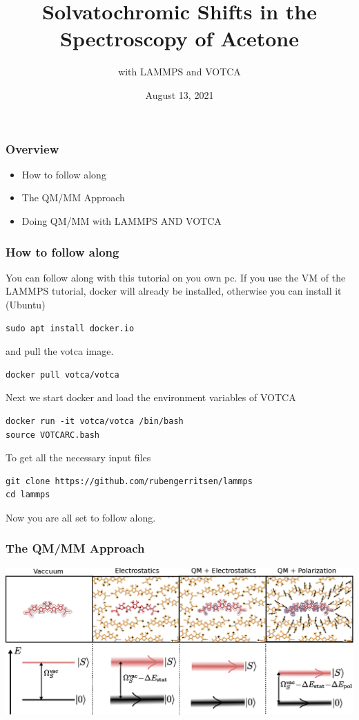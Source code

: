 \documentclass[t,aspectratio=169, 8pt]{beamer}
\title{Solvatochromic Shifts in the Spectroscopy of Acetone}
\subtitle{\Large with LAMMPS and VOTCA}
\author{August 13, 2021}
\begin{document}
\begin{titleframe}[variant=1,bgimage=background.png]
\end{titleframe}

\begin{chapterframe}
  \frametitle{Overview}
  \begin{itemize}
    \item How to follow along
    \item The QM/MM Approach
    \item Doing QM/MM with LAMMPS AND VOTCA
  \end{itemize}
\end{chapterframe}



\begin{frame}[fragile]
  \frametitle{How to follow along}
  You can follow along with this tutorial on you own pc. If you use the VM of the LAMMPS tutorial, docker will already be installed, otherwise you can install it (Ubuntu)
  \begin{verbatim}
sudo apt install docker.io
  \end{verbatim}
  and pull the votca image.
  \begin{verbatim}
docker pull votca/votca
  \end{verbatim}
  Next we start docker and load the environment variables of VOTCA
  \begin{verbatim}
docker run -it votca/votca /bin/bash
source VOTCARC.bash
  \end{verbatim}
  To get all the necessary input files
  \begin{verbatim}
git clone https://github.com/rubengerritsen/lammps
cd lammps
\end{verbatim}
  Now you are all set to follow along.
\end{frame}


\begin{frame}
  \frametitle{The QM/MM Approach}
  \centering
  \includegraphics[height=0.65\textheight]{images/siteenergies}
\end{frame}
\end{document}
